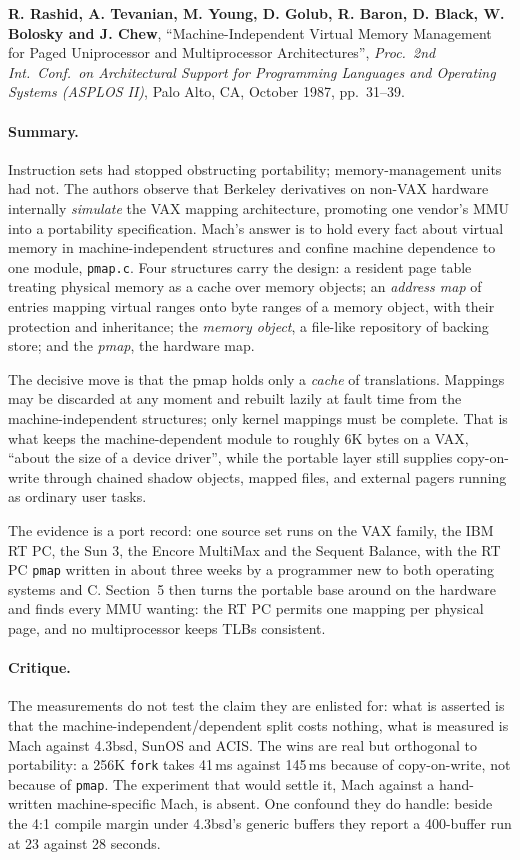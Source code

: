 \noindent\textbf{R. Rashid, A. Tevanian, M. Young, D. Golub, R. Baron, D. Black,
W. Bolosky and J. Chew}, ``Machine-Independent Virtual Memory Management for Paged
Uniprocessor and Multiprocessor Architectures'', \emph{Proc.\ 2nd Int.\ Conf.\ on
Architectural Support for Programming Languages and Operating Systems (ASPLOS II)},
Palo Alto, CA, October 1987, pp.~31--39.

\paragraph{Summary.}
Instruction sets had stopped obstructing portability; memory-management units had not.
The authors observe that Berkeley derivatives on non-VAX hardware internally
\emph{simulate} the VAX mapping architecture, promoting one vendor's MMU into a
portability specification. Mach's answer is to hold every fact about virtual memory in
machine-independent structures and confine machine dependence to one module,
\texttt{pmap.c}. Four structures carry the design: a resident page table treating
physical memory as a cache over memory objects; an \emph{address map} of entries mapping
virtual
ranges onto byte ranges of a memory object, with their protection and inheritance; the
\emph{memory object}, a file-like repository of backing store; and the \emph{pmap}, the
hardware map.

The decisive move is that the pmap holds only a \emph{cache} of translations. Mappings
may be discarded at any moment and rebuilt lazily at fault time from the
machine-independent structures; only kernel mappings must be complete. That is what
keeps the machine-dependent module to roughly 6K bytes on a VAX, ``about the size of a
device driver'', while the portable layer still supplies copy-on-write through chained shadow
objects, mapped files, and external pagers running as ordinary user tasks.

The evidence is a port record: one source set runs on the VAX family, the IBM RT PC, the
Sun 3, the Encore MultiMax and the Sequent Balance, with the RT PC \texttt{pmap} written
in about three weeks by a programmer new to both operating systems and C. Section~5 then
turns the portable base around on the hardware and finds every MMU wanting: the RT PC
permits one mapping per physical page, and no multiprocessor keeps TLBs consistent.

\paragraph{Critique.}
The measurements do not test the claim they are enlisted for: what is asserted is that the
machine-independent/dependent split costs nothing, what is measured is Mach against 4.3bsd,
SunOS and ACIS. The wins are real but orthogonal to portability: a 256K
\texttt{fork} takes 41\,ms against 145\,ms because of copy-on-write, not because of
\texttt{pmap}. The experiment that would settle it, Mach against a hand-written
machine-specific Mach, is absent. One confound they do handle: beside the 4:1 compile
margin under 4.3bsd's generic buffers they report a 400-buffer run at 23 against 28
seconds.

